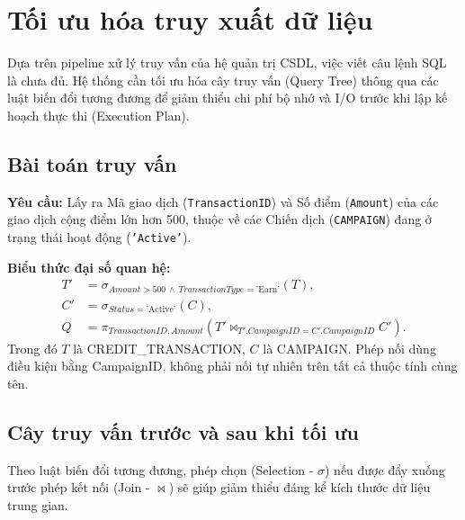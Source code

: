 \section{Tối ưu hóa truy xuất dữ liệu}

Dựa trên pipeline xử lý truy vấn của hệ quản trị CSDL, việc viết câu lệnh SQL là chưa đủ. Hệ thống cần tối ưu hóa cây truy vấn (Query Tree) thông qua các luật biến đổi tương đương để giảm thiểu chi phí bộ nhớ và I/O trước khi lập kế hoạch thực thi (Execution Plan).

\subsection{Bài toán truy vấn}
\textbf{Yêu cầu:} Lấy ra Mã giao dịch (\texttt{TransactionID}) và Số điểm (\texttt{Amount}) của các giao dịch cộng điểm lớn hơn 500, thuộc về các Chiến dịch (\texttt{CAMPAIGN}) đang ở trạng thái hoạt động (\texttt{'Active'}).

\textbf{Biểu thức đại số quan hệ:}
\[
\begin{aligned}
T' &= \sigma_{Amount > 500 \,\wedge\, TransactionType = \text{'Earn'}}(T),\\
C' &= \sigma_{Status = \text{'Active'}}(C),\\
Q &= \pi_{TransactionID,Amount}(T' \bowtie_{T'.CampaignID=C'.CampaignID} C').
\end{aligned}
\]
Trong đó $T$ là CREDIT\_TRANSACTION, $C$ là CAMPAIGN. Phép nối dùng điều kiện bằng CampaignID, không phải nối tự nhiên trên tất cả thuộc tính cùng tên.

\subsection{Cây truy vấn trước và sau khi tối ưu}

Theo luật biến đổi tương đương, phép chọn (Selection - $\sigma$) nếu được đẩy xuống trước phép kết nối (Join - $\bowtie$) sẽ giúp giảm thiểu đáng kể kích thước dữ liệu trung gian.

